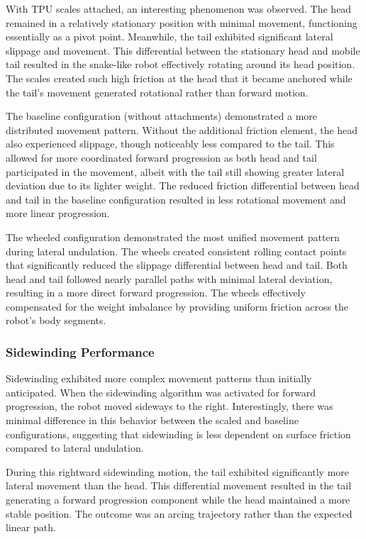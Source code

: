 \documentclass[12pt,a4paper]{report}
\begin{document}
With TPU scales attached, an interesting phenomenon was observed. The head remained in a relatively stationary position with minimal movement, functioning essentially as a pivot point. Meanwhile, the tail exhibited significant lateral slippage and movement. This differential between the stationary head and mobile tail resulted in the snake-like robot effectively rotating around its head position. The scales created such high friction at the head that it became anchored while the tail's movement generated rotational rather than forward motion.

The baseline configuration (without attachments) demonstrated a more distributed movement pattern. Without the additional friction element, the head also experienced slippage, though noticeably less compared to the tail. This allowed for more coordinated forward progression as both head and tail participated in the movement, albeit with the tail still showing greater lateral deviation due to its lighter weight. The reduced friction differential between head and tail in the baseline configuration resulted in less rotational movement and more linear progression.

The wheeled configuration demonstrated the most unified movement pattern during lateral undulation. The wheels created consistent rolling contact points that significantly reduced the slippage differential between head and tail. Both head and tail followed nearly parallel paths with minimal lateral deviation, resulting in a more direct forward progression. The wheels effectively compensated for the weight imbalance by providing uniform friction across the robot's body segments.

\subsubsection{Sidewinding Performance}
Sidewinding exhibited more complex movement patterns than initially anticipated. When the sidewinding algorithm was activated for forward progression, the robot moved sideways to the right. Interestingly, there was minimal difference in this behavior between the scaled and baseline configurations, suggesting that sidewinding is less dependent on surface friction compared to lateral undulation.

During this rightward sidewinding motion, the tail exhibited significantly more lateral movement than the head. This differential movement resulted in the tail generating a forward progression component while the head maintained a more stable position. The outcome was an arcing trajectory rather than the expected linear path.
\end{document}
